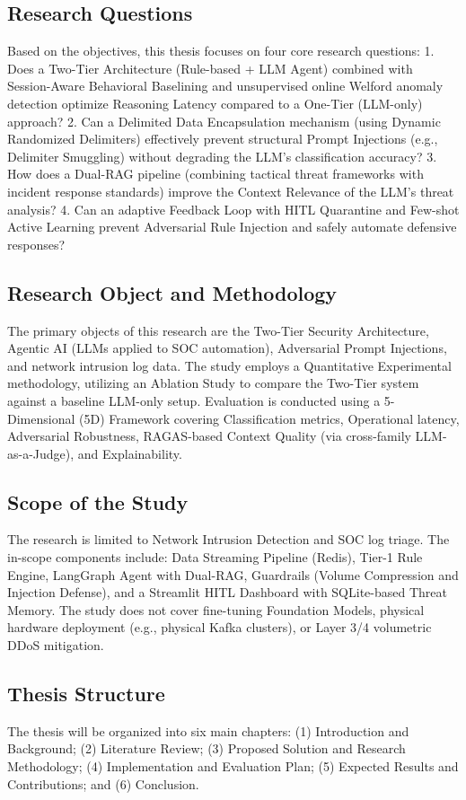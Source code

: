 \documentclass[12pt,a4paper]{article}
\begin{document}
\subsection{Research Questions}
Based on the objectives, this thesis focuses on four core research questions:
1. Does a Two-Tier Architecture (Rule-based + LLM Agent) combined with Session-Aware Behavioral Baselining and unsupervised online Welford anomaly detection optimize Reasoning Latency compared to a One-Tier (LLM-only) approach?
2. Can a Delimited Data Encapsulation mechanism (using Dynamic Randomized Delimiters) effectively prevent structural Prompt Injections (e.g., Delimiter Smuggling) without degrading the LLM's classification accuracy?
3. How does a Dual-RAG pipeline (combining tactical threat frameworks with incident response standards) improve the Context Relevance of the LLM's threat analysis?
4. Can an adaptive Feedback Loop with HITL Quarantine and Few-shot Active Learning prevent Adversarial Rule Injection and safely automate defensive responses?

\subsection{Research Object and Methodology}
The primary objects of this research are the Two-Tier Security Architecture, Agentic AI (LLMs applied to SOC automation), Adversarial Prompt Injections, and network intrusion log data.
The study employs a Quantitative Experimental methodology, utilizing an Ablation Study to compare the Two-Tier system against a baseline LLM-only setup. Evaluation is conducted using a 5-Dimensional (5D) Framework covering Classification metrics, Operational latency, Adversarial Robustness, RAGAS-based Context Quality (via cross-family LLM-as-a-Judge), and Explainability.

\subsection{Scope of the Study}
The research is limited to Network Intrusion Detection and SOC log triage. The in-scope components include: Data Streaming Pipeline (Redis), Tier-1 Rule Engine, LangGraph Agent with Dual-RAG, Guardrails (Volume Compression and Injection Defense), and a Streamlit HITL Dashboard with SQLite-based Threat Memory. The study does not cover fine-tuning Foundation Models, physical hardware deployment (e.g., physical Kafka clusters), or Layer 3/4 volumetric DDoS mitigation.

\subsection{Thesis Structure}
The thesis will be organized into six main chapters: (1) Introduction and Background; (2) Literature Review; (3) Proposed Solution and Research Methodology; (4) Implementation and Evaluation Plan; (5) Expected Results and Contributions; and (6) Conclusion.
\end{document}
